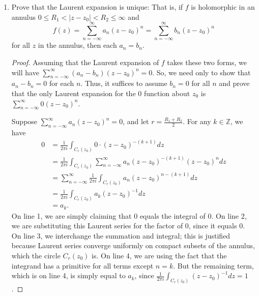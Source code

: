 \documentclass[10pt]{article}
\newcommand{\Z}{\mathbb{Z}}
\begin{document}
\begin{enumerate}
\begin{proof}
Thus,
$$
 \int_c^d \int_a^b |u(s,t)| ds dt < |a-b| |c-d| r < \infty
$$
and
$$
 \int_c^d \int_a^b |v(s,t)| ds dt < |a-b| |c-d| r < \infty.
$$

Therefore, we may apply Fubini's Theorem to each of these integrals:
\begin{align*}
\int_{\gamma_2}\int_{\gamma_1} f(z,w) dzdw
&=
\int_c^d \int_a^b f(\gamma_1(s),\gamma_2(t)) \gamma_1 ' (s) \gamma_2 ' (t) ds dt
\\
&= \int_c^d \int_a^b u(s,t) + i v(s,t) ds dt
\\
&= \int_c^d \int_a^b u(s,t)ds dt + i \int_c^d \int_a^b  v(s,t) ds dt
\\
&= \int_a^b \int_c^d u(s,t)ds dt + i \int_a^b \int_c^d  v(s,t) ds dt
\\
&=
\int_a^b \int_c^d f(\gamma_1(s),\gamma_2(t)) \gamma_1 ' (s) \gamma_2 ' (t) ds dt
\\
&= \int_{\gamma_1}\int_{\gamma_2} f(z,w) dwdz.
\end{align*}
\end{proof}

\item Prove that the Laurent expansion is unique: That is, if $f$ is holomorphic in an annulus $0 \leq R_1 < |z-z_0| < R_2 \leq \infty$ and $$f(z) = \sum\limits_{n=-\infty}^\infty a_n (z-z_0)^n = \sum\limits_{n=-\infty}^\infty b_n (z-z_0)^n$$ for all $z$ in the annulus, then each $a_n = b_n$.

\begin{proof}
Assuming that the Laurent expansion of $f$ takes these two forms, we will have $\sum\limits_{n=-\infty}^\infty (a_n - b_n) (z-z_0)^n = 0$.  So, we need only to show that $a_n - b_n = 0$ for each $n$.  Thus, it suffices to assume $b_n = 0$ for all $n$ and prove that the only Laurent expansion for the $0$ function about $z_0$ is $\sum\limits_{n=-\infty}^\infty 0 (z-z_0)^n $.

Suppose $\sum\limits_{n=-\infty}^\infty a_n (z-z_0)^n = 0$, and let $r = \frac{R_1 + R_2}{2}$.  For any $k \in \Z$, we have
\begin{align}
0 &= \frac{1}{2\pi i} \int_{C_{r}(z_0)} 0 \cdot (z-z_0)^{-(k+1)} dz
\\
&= \frac{1}{2\pi i} \int_{C_{r}(z_0)} \sum\limits_{n=-\infty}^\infty a_n (z-z_0)^{-(k+1)} (z-z_0)^n dz
\\
&= \sum\limits_{n=-\infty}^\infty \frac{1}{2\pi i} \int_{C_{r}(z_0)} a_n (z-z_0)^{n-(k+1)} dz
\\
&= \frac{1}{2\pi i} \int_{C_{r}(z_0)} a_k (z-z_0)^{-1} dz
\\
&= a_k.
\end{align}
On line 1, we are simply claiming that 0 equals the integral of 0.  On line 2, we are substituting this Laurent series for the factor of 0, since it equals 0.  On line 3, we interchange the summation and integral; this is justified because Laurent series converge uniformly on compact subsets of the annulus, which the circle $C_r(z_0)$ is.  On line 4, we are using the fact that the integrand has a primitive for all terms except $n = k$.  But the remaining term, which is on line 4, is simply equal to $a_k$, since $\frac{1}{2\pi i}\int_{C_r(z_0)} (z-z_0)^{-1}dz = 1$.
\end{proof}


\end{enumerate}
\end{document}
